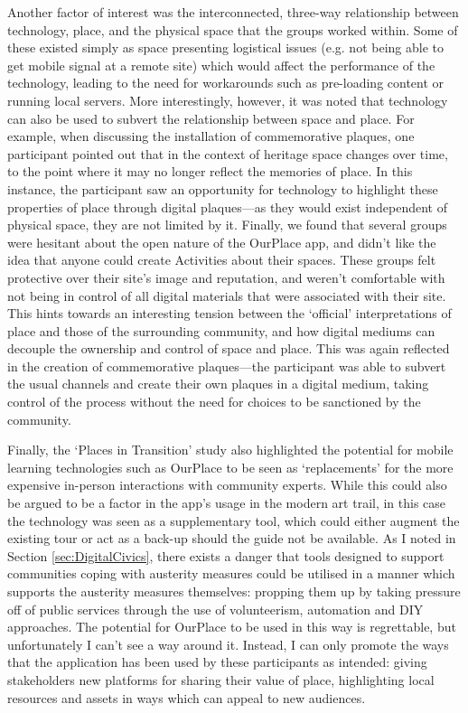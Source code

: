 Another factor of interest was the interconnected, three-way relationship between technology, place, and the physical space that the groups worked within. Some of these existed simply as space presenting logistical issues (e.g. not being able to get mobile signal at a remote site) which would affect the performance of the technology, leading to the need for workarounds such as pre-loading content or running local servers. More interestingly, however, it was noted that technology can also be used to subvert the relationship between space and place. For example, when discussing the installation of commemorative plaques, one participant pointed out that in the context of heritage space changes over time, to the point where it may no longer reflect the memories of place. In this instance, the participant saw an opportunity for technology to highlight these properties of place through digital plaques---as they would exist independent of physical space, they are not limited by it. Finally, we found that several groups were hesitant about the open nature of the OurPlace app, and didn't like the idea that anyone could create Activities about their spaces. These groups felt protective over their site's image and reputation, and weren't comfortable with not being in control of all digital materials that were associated with their site. This hints towards an interesting tension between the `official' interpretations of place and those of the surrounding community, and how digital mediums can decouple the ownership and control of space and place. This was again reflected in the creation of commemorative plaques---the participant was able to subvert the usual channels and create their own plaques in a digital medium, taking control of the process without the need for choices to be sanctioned by the community.  

Finally, the `Places in Transition' study also highlighted the potential for mobile learning technologies such as OurPlace to be seen as `replacements' for the more expensive in-person interactions with community experts. While this could also be argued to be a factor in the app's usage in the modern art trail, in this case the technology was seen as a supplementary tool, which could either augment the existing tour or act as a back-up should the guide not be available. As I noted in Section \ref{sec:DigitalCivics}, there exists a danger that tools designed to support communities coping with austerity measures could be utilised in a manner which supports the austerity measures themselves: propping them up by taking pressure off of public services through the use of volunteerism, automation and DIY approaches. The potential for OurPlace to be used in this way is regrettable, but unfortunately I can't see a way around it. Instead, I can only promote the ways that the application has been used by these participants as intended: giving stakeholders new platforms for sharing their value of place, highlighting local resources and assets in ways which can appeal to new audiences.

